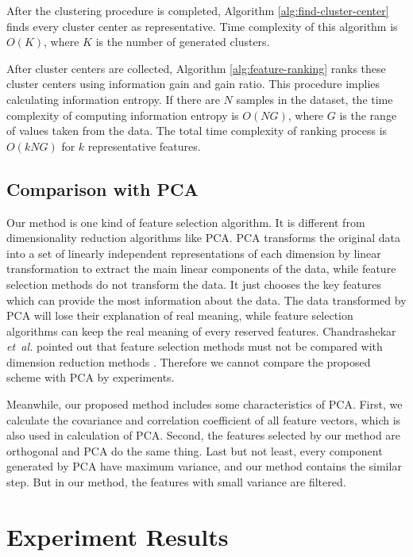 \documentclass{ieeeaccess}
\theoremstyle{definition}
\begin{document}
After the clustering procedure is completed, Algorithm \ref{alg:find-cluster-center} finds every cluster center as representative. Time complexity of this algorithm is $O(K)$, where $K$ is the number of generated clusters. 

After cluster centers are collected, Algorithm \ref{alg:feature-ranking} ranks these cluster centers using information gain and gain ratio. This procedure implies calculating information entropy. If there are $N$ samples in the dataset, the time complexity of computing information entropy is $O(NG)$, where $G$ is the range of values taken from the data. The total time complexity of ranking process is $O(kNG)$ for $k$ representative features.

\subsection{Comparison with PCA}

Our method is one kind of feature selection algorithm. It is different from dimensionality reduction algorithms like PCA\cite{PCA1987}. PCA transforms the original data into a set of linearly independent representations of each dimension by linear transformation to extract the main linear components of the data, while feature selection methods do not transform the data. It just chooses the key features which can provide the most information about the data. The data transformed by PCA will lose their explanation of real meaning, while feature selection algorithms can keep the real meaning of every reserved features. Chandrashekar \emph{et~al.} pointed out that feature selection methods must not be compared with dimension reduction methods \cite{Chandrashekar2014}. Therefore we cannot compare the proposed scheme with PCA by experiments.

Meanwhile, our proposed method includes some characteristics of PCA. First, we calculate the covariance and correlation coefficient of all feature vectors, which is also used in calculation of PCA. Second, the features selected by our method are orthogonal and PCA do the same thing. Last but not least, every component generated by PCA have maximum variance, and our method contains the similar step. But in our method, the features with small variance are filtered.

\section{Experiment Results}
\label{sec:experiments}
\end{document}
